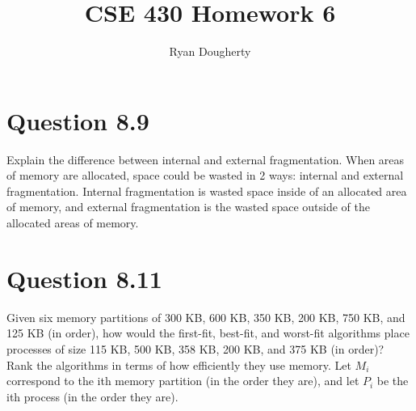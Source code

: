 \documentclass[12pt]{article}
\title{CSE 430 Homework 6}
\author{Ryan Dougherty}
\date{}                                           %
\begin{document}
\maketitle

\section*{Question 8.9} {\color{blue}Explain the difference between internal and external fragmentation.} When areas of memory are allocated, space could be wasted in 2 ways: internal and external fragmentation. Internal fragmentation is wasted space inside of an allocated area of memory, and external fragmentation is the wasted space outside of the allocated areas of memory.

\section*{Question 8.11} {\color{blue}Given six memory partitions of 300 KB, 600 KB, 350 KB, 200 KB, 750 KB, and 125 KB (in order), how would the first-fit, best-fit, and worst-fit algorithms place processes of size 115 KB, 500 KB, 358 KB, 200 KB, and 375 KB (in order)? Rank the algorithms in terms of how efficiently they use memory.} Let $M_{i}$ correspond to the ith memory partition (in the order they are), and let $P_{i}$ be the ith process (in the order they are).
\end{document}
